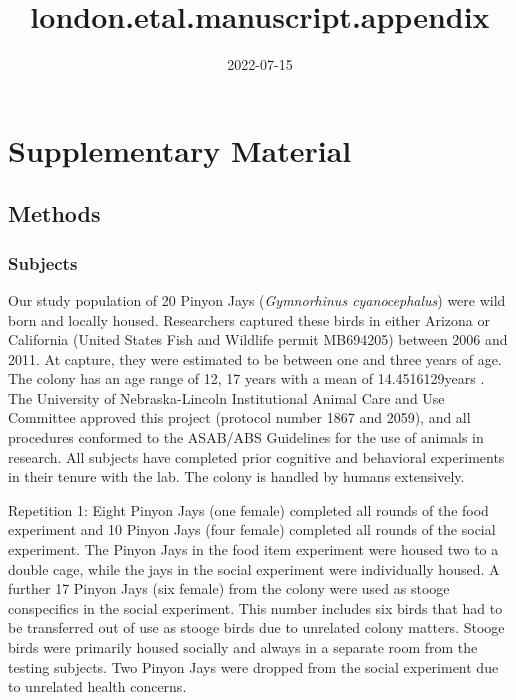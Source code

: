 \documentclass[
]{article}
\title{london.etal.manuscript.appendix}
\author{}
\date{\vspace{-2.5em}2022-07-15}
\begin{document}
\maketitle

\hypertarget{supplementary-material}{%
\section{Supplementary Material}\label{supplementary-material}}

\hypertarget{methods}{%
\subsection{Methods}\label{methods}}

\hypertarget{subjects}{%
\subsubsection{Subjects}\label{subjects}}

Our study population of 20 Pinyon Jays (\emph{Gymnorhinus
cyanocephalus}) were wild born and locally housed. Researchers captured
these birds in either Arizona or California (United States Fish and
Wildlife permit MB694205) between 2006 and 2011. At capture, they were
estimated to be between one and three years of age. The colony has an
age range of 12, 17 years with a mean of 14.4516129years . The
University of Nebraska-Lincoln Institutional Animal Care and Use
Committee approved this project (protocol number 1867 and 2059), and all
procedures conformed to the ASAB/ABS Guidelines for the use of animals
in research. All subjects have completed prior cognitive and behavioral
experiments in their tenure with the lab. The colony is handled by
humans extensively.

Repetition 1: Eight Pinyon Jays (one female) completed all rounds of the
food experiment and 10 Pinyon Jays (four female) completed all rounds of
the social experiment. The Pinyon Jays in the food item experiment were
housed two to a double cage, while the jays in the social experiment
were individually housed. A further 17 Pinyon Jays (six female) from the
colony were used as stooge conspecifics in the social experiment. This
number includes six birds that had to be transferred out of use as
stooge birds due to unrelated colony matters. Stooge birds were
primarily housed socially and always in a separate room from the testing
subjects. Two Pinyon Jays were dropped from the social experiment due to
unrelated health concerns.
\end{document}

